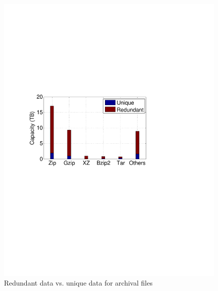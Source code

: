 \begin{figure}[t]
\begin{minipage}{0.278\textwidth}
		\includegraphics[width=1\textwidth]{graphs/type-tar-type}
		\caption{Redundant data vs. unique data for archival files}
		\label{fig-file}
	\end{minipage}
	\begin{minipage}{0.28\textwidth}
		\centering

\end{minipage}
\end{figure}
